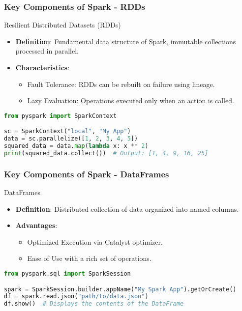 \documentclass[aspectratio=169]{beamer}
\begin{document}
\begin{frame}[fragile]
    \frametitle{Key Components of Spark - RDDs}
    \begin{block}{Resilient Distributed Datasets (RDDs)}
        \begin{itemize}
            \item \textbf{Definition}: Fundamental data structure of Spark, immutable collections processed in parallel.
            \item \textbf{Characteristics}:
            \begin{itemize}
                \item Fault Tolerance: RDDs can be rebuilt on failure using lineage.
                \item Lazy Evaluation: Operations executed only when an action is called.
            \end{itemize}
        \end{itemize}
    
        \begin{lstlisting}[language=Python]
from pyspark import SparkContext

sc = SparkContext("local", "My App")
data = sc.parallelize([1, 2, 3, 4, 5])
squared_data = data.map(lambda x: x ** 2)
print(squared_data.collect())  # Output: [1, 4, 9, 16, 25]
        \end{lstlisting}
    \end{block}
\end{frame}

\begin{frame}[fragile]
    \frametitle{Key Components of Spark - DataFrames}
    \begin{block}{DataFrames}
        \begin{itemize}
            \item \textbf{Definition}: Distributed collection of data organized into named columns.
            \item \textbf{Advantages}:
            \begin{itemize}
                \item Optimized Execution via Catalyst optimizer.
                \item Ease of Use with a rich set of operations.
            \end{itemize}
        \end{itemize}
        
        \begin{lstlisting}[language=Python]
from pyspark.sql import SparkSession

spark = SparkSession.builder.appName("My Spark App").getOrCreate()
df = spark.read.json("path/to/data.json")
df.show()  # Displays the contents of the DataFrame
        \end{lstlisting}
    \end{block}
\end{frame}
\end{document}
